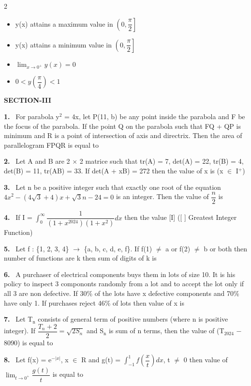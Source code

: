 \documentclass[10pt]{extarticle}
\newcommand{\sect}[1]{\par\smallskip\noindent\textbf{#1}\par}
\newcommand{\qn}[1]{\par\smallskip\noindent\textbf{#1.}~}
\newenvironment{qoptions}{\begin{itemize}[leftmargin=1.8em,itemsep=1pt,topsep=2pt,label={}]}{\end{itemize}}
\newcommand{\opt}[2]{\item[(#1)] #2}
\begin{document}
\begin{multicols}{2}
\begin{qoptions}
\opt{A}{y(x) attains a maximum value in $\left(0,\dfrac\pi2\right]$}
\opt{B}{y(x) attains a minimum value in $\left(0,\dfrac\pi2\right]$}
\opt{C}{$\displaystyle\lim_{x\to0^+}y(x)=0$}
\opt{D}{$0<y\left(\dfrac\pi4\right)<1$}
\end{qoptions}
\sect{SECTION-III}
\qn{1} For parabola y$^2$ = 4x, let P(11, b) be any point inside the parabola and F be the focus of the parabola. If the point Q on the parabola such that FQ + QP is minimum and R is a point of intersection of axis and directrix. Then the area of parallelogram FPQR is equal to
\qn{2} Let A and B are 2 $\times$ 2 matrice such that tr(A) = 7, det(A) = 22, tr(B) = 4, det(B) = 11, tr(AB) = 33. If det(A + xB) = 272 then the value of x is (x $\in$ I$^+$)
\qn{3} Let n be a positive integer such that exactly one root of the equation $4x^2-\left(4\sqrt3+4\right)x+\sqrt3n-24=0$ is an integer. Then the value of $\dfrac n2$ is
\qn{4} If I = $\displaystyle\int_0^\infty\dfrac1{\left(1+x^{2024}\right)\left(1+x^2\right)}dx$ then the value [I] ([ ] Greatest Integer Function)
\qn{5} Let f : \{1, 2, 3, 4\} $\to$ \{a, b, c, d, e, f\}. If f(1) $\neq$ a or f(2) $\neq$ b or both then number of functions are k then sum of digits of k is
\qn{6} A purchaser of electrical components buys them in lots of size 10. It is his policy to inspect 3 compononts randomly from a lot and to accept the lot only if all 3 are non defective. If 30\% of the lots have x defective components and 70\% have only 1. If purchases reject 46\% of lots then value of x is
\qn{7} Let T$_\mathrm n$ consists of general term of positive numbers (where n is positive integer). If $\dfrac{T_n+2}2=\sqrt{2S_n}$ and S$_\mathrm n$ is sum of n terms, then the value of (T$_{2024}$ $-$ 8090) is equal to
\qn{8} Let f(x) = e$^{-|x|}$, x $\in$ R and g(t) = $\displaystyle\int_{-1}^{1}f\left(\dfrac xt\right)dx$, t $\neq$ 0 then value of $\displaystyle\lim_{t\to0^+}\dfrac{g(t)}t$ is equal to
\end{multicols}
\end{document}
